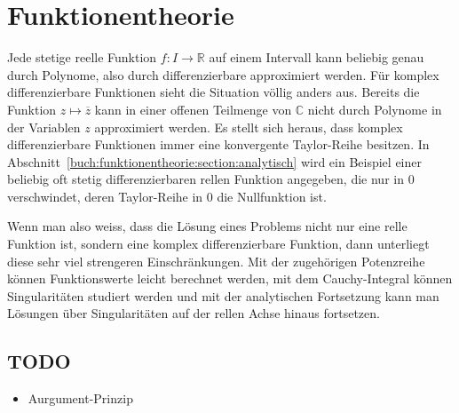 %
%
%
\chapter{Funktionentheorie
\label{buch:chapter:funktionentheorie}}
\rhead{}
Jede stetige reelle Funktion $f\colon I\to\mathbb{R}$ auf einem
Intervall kann beliebig genau durch Polynome, also durch
differenzierbare approximiert werden.
Für komplex differenzierbare Funktionen sieht die Situation
völlig anders aus.
Bereits die Funktion $z\mapsto \overline{z}$ kann in einer offenen
Teilmenge von $\mathbb{C}$ nicht durch Polynome in der Variablen $z$
approximiert werden.
Es stellt sich heraus, dass komplex differenzierbare Funktionen
immer eine konvergente Taylor-Reihe besitzen.
In Abschnitt~\ref{buch:funktionentheorie:section:analytisch} wird
ein Beispiel einer beliebig oft stetig differenzierbaren rellen
Funktion angegeben, die nur in $0$ verschwindet, deren Taylor-Reihe
in $0$ die Nullfunktion ist.

Wenn man also weiss, dass die Lösung eines Problems nicht nur eine
relle Funktion ist, sondern eine komplex differenzierbare Funktion,
dann unterliegt diese sehr viel strengeren Einschränkungen.
Mit der zugehörigen Potenzreihe können Funktionswerte leicht berechnet
werden, mit dem Cauchy-Integral können Singularitäten studiert werden
und mit der analytischen Fortsetzung kann man Lösungen über Singularitäten
auf der rellen Achse hinaus fortsetzen.






\section{TODO}
\begin{itemize}
\item Aurgument-Prinzip
\end{itemize}


